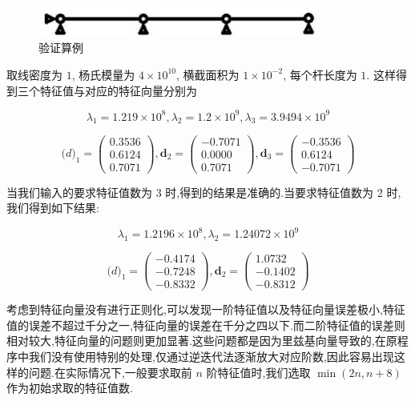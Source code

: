 \begin{figure}[htbp]
  \centering
  \includegraphics[height=1cm]{modalex}
  \caption{验证算例}
  \label{modalex1}
\end{figure}

取线密度为 $1$, 杨氏模量为 $4\times 10^{10}$, 横截面积为 $1\times 10^{-2}$, 每个杆长度为 $1$. 这样得到三个特征值与对应的特征向量分别为

\[
\lambda_1=1.219\times10^8,\lambda_2=1.2\times10^9,\lambda_3=3.9494\times10^9 \]

\[
\mathbf(d)_1=\left( \begin{array}{c} 0.3536 \\ 0.6124 \\ 0.7071 \end{array} \right),
\mathbf{d}_2=\left( \begin{array}{c} -0.7071 \\ 0.0000 \\ 0.7071 \end{array} \right),
\mathbf{d}_3=\left( \begin{array}{c} -0.3536 \\ 0.6124 \\ -0.7071 \end{array} \right) \]

当我们输入的要求特征值数为 3 时,得到的结果是准确的.当要求特征值数为 2 时,我们得到如下结果:

\[
\lambda_1=1.2196\times10^8,\lambda_2=1.24072\times10^9 \]

\[
\mathbf(d)_1=\left( \begin{array}{c} -0.4174 \\ -0.7248 \\ -0.8332 \end{array} \right),
\mathbf{d}_2=\left( \begin{array}{c} 1.0732 \\ -0.1402 \\ -0.8312 \end{array} \right) \]

考虑到特征向量没有进行正则化,可以发现一阶特征值以及特征向量误差极小,特征值的误差不超过千分之一,特征向量的误差在千分之四以下.而二阶特征值的误差则相对较大,特征向量的问题则更加显著.这些问题都是因为里兹基向量导致的,在原程序中我们没有使用特别的处理,仅通过逆迭代法逐渐放大对应阶数,因此容易出现这样的问题.在实际情况下,一般要求取前 $n$ 阶特征值时,我们选取 $\min (2n,n+8)$ 作为初始求取的特征值数.

